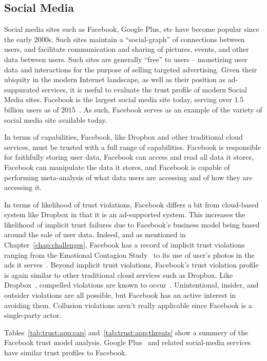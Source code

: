 \subsection{Social Media}

Social media sites such as Facebook, Google Plus, etc have become
popular since the early 2000s. Such sites maintain a ``social-graph''
of connections between users, and facilitate communication and sharing
of pictures, events, and other data between users. Such sites are
generally ``free'' to users -- monetizing user data and interactions
for the purpose of selling targeted advertising. Given their ubiquity
in the modern Internet landscape, as well as their position as
ad-suppurated services, it is useful to evaluate the trust profile of
modern Social Media sites. Facebook is the largest social media site
today, serving over 1.5 billion users as of 2015~\cite{foster2014}. As
such, Facebook serves as an example of the variety of social media
site available today.

In terms of capabilities, Facebook, like Dropbox and other traditional
cloud services, must be trusted with a full range of
capabilities. Facebook is responsible for faithfully storing user
data, Facebook can access and read all data it stores, Facebook can
manipulate the data it stores, and Facebook is capable of performing
meta-analysis of what data users are accessing and of how they are
accessing it.

In terms of likelihood of trust violations, Facebook differs a bit
from cloud-based system like Dropbox in that it is an ad-supported
system. This increases the likelihood of implicit trust failures due
to Facebook's business model being based around the sale of user
data. Indeed, and as mentioned in Chapter~\ref{chap:challenges},
Facebook has a record of implicit trust violations ranging from the
Emotional Contagion Study~\cite{goel2014} to its use of user's photos
in the ads it serves~\cite{mashable-socialads}. Beyond implicit trust
violations, Facebook's trust violation profile is again similar to
other traditional cloud services such as Dropbox. Like
Dropbox~\cite{dropbox-transparency}, compelled violations are known to
occur~\cite{facebook-transparency}. Unintentional, insider, and
outsider violations are all possible, but Facebook has an active
interest in avoiding them. Collusion violations aren't really
applicable since Facebook is a single-party actor.

Tables~\ref{tab:trust:app:cap} and~\ref{tab:trust:app:threats} show a
summery of the Facebook trust model analysis. Google
Plus~\cite{google-plus} and related social-media services have similar
trust profiles to Facebook.

